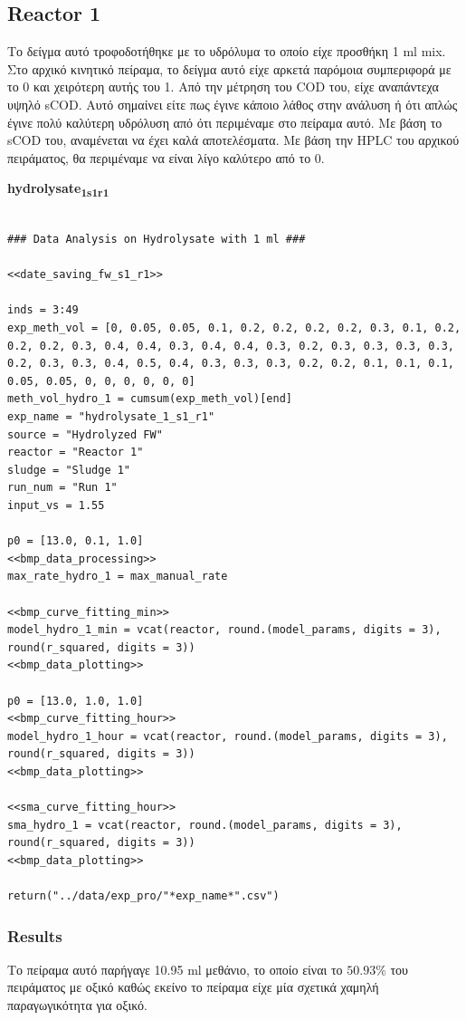 \documentclass[11pt]{article}
\begin{document}
\subsection{Reactor 1}
\label{sec:org2e00e3d}
Το δείγμα αυτό τροφοδοτήθηκε με το υδρόλυμα το οποίο είχε προσθήκη 1 ml mix. Στο αρχικό κινητικό πείραμα, το δείγμα αυτό είχε αρκετά παρόμοια συμπεριφορά με το 0 και χειρότερη αυτής του 1. Από την μέτρηση του COD του, είχε αναπάντεχα υψηλό sCOD. Αυτό σημαίνει είτε πως έγινε κάποιο λάθος στην ανάλυση ή ότι απλώς έγινε πολύ καλύτερη υδρόλυση από ότι περιμέναμε στο πείραμα αυτό. Με βάση το sCOD του, αναμένεται να έχει καλά αποτελέσματα. Με βάση την HPLC του αρχικού πειράματος, θα περιμέναμε να είναι λίγο καλύτερο από το 0.

\textbf{hydrolysate\textsubscript{1}\textsubscript{s1}\textsubscript{r1}}
\begin{verbatim}

### Data Analysis on Hydrolysate with 1 ml ###

<<date_saving_fw_s1_r1>>

inds = 3:49
exp_meth_vol = [0, 0.05, 0.05, 0.1, 0.2, 0.2, 0.2, 0.2, 0.3, 0.1, 0.2, 0.2, 0.2, 0.3, 0.4, 0.4, 0.3, 0.4, 0.4, 0.3, 0.2, 0.3, 0.3, 0.3, 0.3, 0.2, 0.3, 0.3, 0.4, 0.5, 0.4, 0.3, 0.3, 0.3, 0.2, 0.2, 0.1, 0.1, 0.1, 0.05, 0.05, 0, 0, 0, 0, 0, 0]
meth_vol_hydro_1 = cumsum(exp_meth_vol)[end]
exp_name = "hydrolysate_1_s1_r1"
source = "Hydrolyzed FW"
reactor = "Reactor 1"
sludge = "Sludge 1"
run_num = "Run 1"
input_vs = 1.55

p0 = [13.0, 0.1, 1.0]
<<bmp_data_processing>>
max_rate_hydro_1 = max_manual_rate

<<bmp_curve_fitting_min>>
model_hydro_1_min = vcat(reactor, round.(model_params, digits = 3), round(r_squared, digits = 3))
<<bmp_data_plotting>>

p0 = [13.0, 1.0, 1.0]
<<bmp_curve_fitting_hour>>
model_hydro_1_hour = vcat(reactor, round.(model_params, digits = 3), round(r_squared, digits = 3))
<<bmp_data_plotting>>

<<sma_curve_fitting_hour>>
sma_hydro_1 = vcat(reactor, round.(model_params, digits = 3), round(r_squared, digits = 3))
<<bmp_data_plotting>>

return("../data/exp_pro/"*exp_name*".csv")
\end{verbatim}

\subsubsection{Results}
\label{sec:orgf446da9}
Το πείραμα αυτό παρήγαγε 10.95 ml μεθάνιο, το οποίο είναι το \(50.93 \%\) του πειράματος με οξικό καθώς εκείνο το πείραμα είχε μία σχετικά χαμηλή παραγωγικότητα για οξικό.
\end{document}
